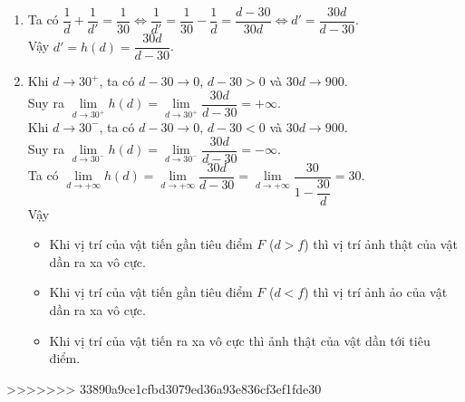 \begin{bt}
{\begin{enumerate}
			\item Ta có $\dfrac{1}{d}+\dfrac{1}{d'}=\dfrac{1}{30} \Leftrightarrow \dfrac{1}{d'} = \dfrac{1}{30} - \dfrac{1}{d} = \dfrac{d-30}{30d} \Leftrightarrow d'= \dfrac{30d}{d-30}$. \\
			Vậy $d'=h(d) = \dfrac{30d}{d-30}$.
			\item 
			Khi $d\to 30^+$, ta có $d-30 \to 0$, $d-30 >0$ và $30d \to 900$.\\
			Suy ra $\lim\limits _{d \rightarrow 30^{+}} h(d) = \lim\limits _{d \rightarrow 30^{+}} \dfrac{30d}{d-30} = +\infty$. \\
			Khi $d\to 30^-$, ta có $d-30 \to 0$, $d-30 <0$ và $30d \to 900$.\\
			Suy ra $\lim\limits _{d \rightarrow 30^{-}} h(d) = \lim\limits _{d \rightarrow 30^{-}} \dfrac{30d}{d-30} = -\infty$. \\
			Ta có $\lim\limits _{d \rightarrow +\infty} h(d) =  \lim\limits _{d \rightarrow +\infty} \dfrac{30d}{d-30} = \lim\limits _{d \rightarrow +\infty}  \dfrac{30}{1-\dfrac{30}{d}} =30$. \\
			Vậy 
			\begin{itemize}
				\item  Khi vị trí của vật tiến gần  tiêu điểm $F$ ($d >f$) thì vị trí ảnh thật của vật dần ra xa vô cực. 
				\item  Khi vị trí của vật tiến gần  tiêu điểm $F$ ($d <f$) thì vị trí ảnh ảo của vật dần ra xa vô cực. 
				\item  Khi vị trí của vật tiến ra xa vô cực thì  ảnh thật của vật dần tới tiêu điểm. 
			\end{itemize}
		\end{enumerate}
	}
\end{bt}


>>>>>>> 33890a9ce1cfbd3079ed36a93e836cf3ef1fde30
